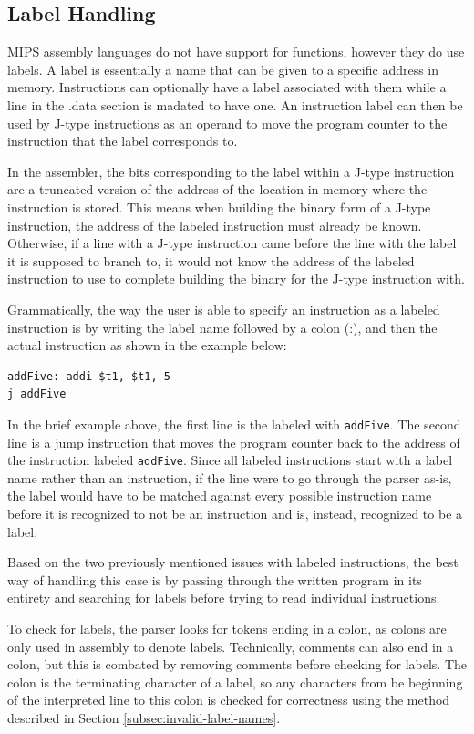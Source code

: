 \documentclass[
    paper=letter,
    parskip=half,
    fontsize=12pt,
    titlepage=firstiscover,
    toc=bibliography,
    numbers=endperiod
]{scrartcl}
\begin{document}
\subsection{Label Handling}

MIPS assembly languages do not have support for functions, however they
do use labels. A label is essentially a name that can be given to a
specific address in memory. Instructions can optionally have a label
associated with them while a line in the .data section is madated to
have one. An instruction label can then be used by J-type instructions
as an operand to move the program counter to the instruction that the
label corresponds to.

In the assembler, the bits corresponding to the label within a J-type
instruction are a truncated version of the address of the location in
memory where the instruction is stored. This means when building the
binary form of a J-type instruction, the address of the labeled
instruction must already be known. Otherwise, if a line with a J-type
instruction came before the line with the label it is supposed to branch
to, it would not know the address of the labeled instruction to use to
complete building the binary for the J-type instruction with.

Grammatically, the way the user is able to specify an instruction as a
labeled instruction is by writing the label name followed by a colon
(:), and then the actual instruction as shown in the example below:

\begin{verbatim}
addFive: addi $t1, $t1, 5
j addFive
\end{verbatim}

In the brief example above, the first line is the labeled with
\texttt{addFive}. The second line is a jump instruction that moves the
program counter back to the address of the instruction labeled
\texttt{addFive}. Since all labeled instructions start with a label name
rather than an instruction, if the line were to go through the parser
as-is, the label would have to be matched against every possible
instruction name before it is recognized to not be an instruction and
is, instead, recognized to be a label.

Based on the two previously mentioned issues with labeled instructions,
the best way of handling this case is by passing through the written
program in its entirety and searching for labels before trying to read
individual instructions.

To check for labels, the parser looks for tokens ending in a colon, as
colons are only used in assembly to denote labels. Technically, comments
can also end in a colon, but this is combated by removing comments
before checking for labels. The colon is the terminating character of a
label, so any characters from be beginning of the interpreted line to
this colon is checked for correctness using the method described in
Section \ref{subsec:invalid-label-names}.
\end{document}
